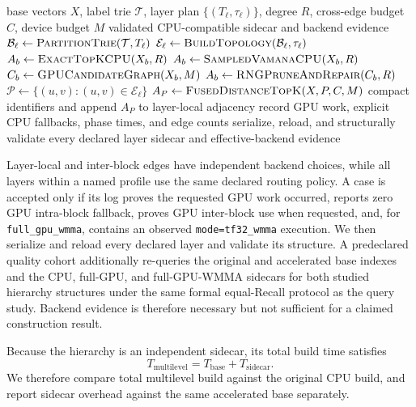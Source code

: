 \documentclass[sigconf,review,anonymous]{acmart}
\begin{document}
\begin{algorithm}[t]
\caption{Hybrid GPU construction of a multilevel sidecar}
\label{alg:gpu-build}
\begin{algorithmic}[1]
\Require base vectors $X$, label trie $\mathcal{T}$, layer plan
  $\{(T_\ell,\tau_\ell)\}$, degree $R$, cross-edge budget $C$, device budget $M$
\Ensure validated CPU-compatible sidecar and backend evidence
  \State $\mathcal{B}_\ell\gets\Call{PartitionTrie}{\mathcal{T},T_\ell}$
  \State $\mathcal{E}_\ell\gets\Call{BuildTopology}{\mathcal{B}_\ell,\tau_\ell}$
      \State $A_b\gets\Call{ExactTopKCPU}{X_b,R}$
      \State $A_b\gets\Call{SampledVamanaCPU}{X_b,R}$
    \Else
      \State $C_b\gets\Call{GPUCandidateGraph}{X_b,M}$
      \State $A_b\gets\Call{RNGPruneAndRepair}{C_b,R}$
    \EndIf
  \EndFor
  \State $\mathcal{P}\gets\{(u,v):(u,v)\in\mathcal{E}_\ell\}$
    \State $A_P\gets\Call{FusedDistanceTopK}{X,P,C,M}$
    \State compact identifiers and append $A_P$ to layer-local adjacency
  \EndFor
  \State record GPU work, explicit CPU fallbacks, phase times, and edge counts
\EndFor
\State serialize, reload, and structurally validate every declared layer
\State \Return sidecar and effective-backend evidence
\end{algorithmic}
\end{algorithm}

Layer-local and inter-block edges have independent backend choices, while all
layers within a named profile use the same declared routing policy.  A case is
accepted only if its log proves the requested GPU work occurred, reports zero
GPU intra-block fallback, proves GPU inter-block use when requested, and, for
\texttt{full\_gpu\_wmma}, contains an observed \texttt{mode=tf32\_wmma}
execution.  We then serialize and reload every declared layer and validate its
structure.  A predeclared quality cohort additionally re-queries the original
and accelerated base indexes and the CPU, full-GPU, and full-GPU-WMMA
sidecars for both studied hierarchy structures under the same formal
equal-Recall protocol as the query study.  Backend evidence is therefore
necessary but not sufficient for a claimed construction result.

Because the hierarchy is an independent sidecar, its total build time satisfies
\begin{equation}
  T_{\mathrm{multilevel}}=T_{\mathrm{base}}+T_{\mathrm{sidecar}}.
\end{equation}
We therefore compare total multilevel build against the original CPU build,
and report sidecar overhead against the same accelerated base separately.
\end{document}
